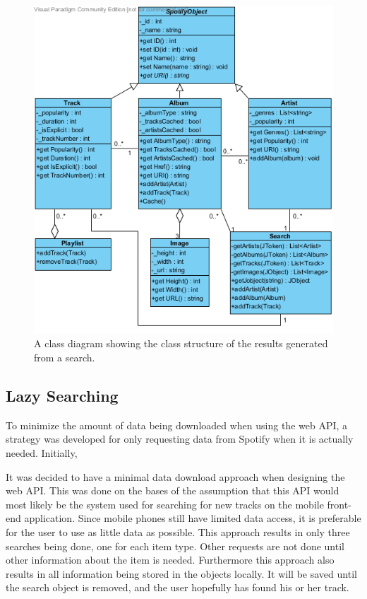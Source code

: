\begin{figure}[hbtp]
\centering
\includegraphics[width=\textwidth]{Images/WebAPIUML.png}
\caption{A class diagram showing the class structure of the results generated from a search.}
\label{fig:WebAPIUML}
\end{figure}

\subsection{Lazy Searching}

To minimize the amount of data being downloaded when using the web API, a strategy was developed for only requesting data from Spotify when it is actually needed. Initially, 

It was decided to have a minimal data download approach when designing the web API. This was done on the bases of the assumption that this API would most likely be the system used for searching for new tracks on the mobile front-end application. Since mobile phones still have limited data access, it is preferable for the user to use as little data as possible. This approach results in only three searches being done, one for each item type. Other requests are not done until other information about the item is needed. Furthermore this approach also results in all information being stored in the objects locally. It will be saved until the search object is removed, and the user hopefully has found his or her track.

